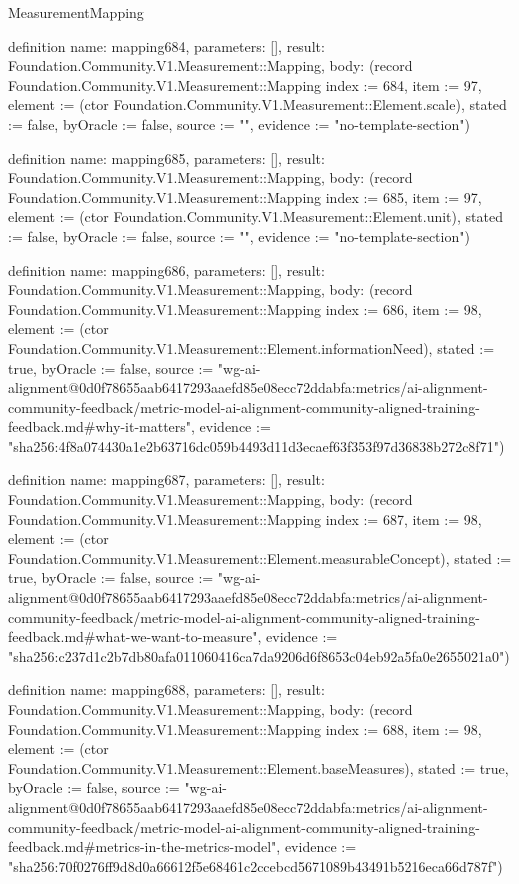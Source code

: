 \begin{lexlean}{MeasurementMapping}
\begin{semanticmodule}
definition{
  name: mapping684,
  parameters: [],
  result: Foundation.Community.V1.Measurement::Mapping,
  body: (record Foundation.Community.V1.Measurement::Mapping {index := 684, item := 97, element := (ctor Foundation.Community.V1.Measurement::Element.scale), stated := false, byOracle := false, source := "", evidence := "no-template-section"})
}

definition{
  name: mapping685,
  parameters: [],
  result: Foundation.Community.V1.Measurement::Mapping,
  body: (record Foundation.Community.V1.Measurement::Mapping {index := 685, item := 97, element := (ctor Foundation.Community.V1.Measurement::Element.unit), stated := false, byOracle := false, source := "", evidence := "no-template-section"})
}

definition{
  name: mapping686,
  parameters: [],
  result: Foundation.Community.V1.Measurement::Mapping,
  body: (record Foundation.Community.V1.Measurement::Mapping {index := 686, item := 98, element := (ctor Foundation.Community.V1.Measurement::Element.informationNeed), stated := true, byOracle := false, source := "wg-ai-alignment@0d0f78655aab6417293aaefd85e08ecc72ddabfa:metrics/ai-alignment-community-feedback/metric-model-ai-alignment-community-aligned-training-feedback.md#why-it-matters", evidence := "sha256:4f8a074430a1e2b63716dc059b4493d11d3ecaef63f353f97d36838b272c8f71"})
}

definition{
  name: mapping687,
  parameters: [],
  result: Foundation.Community.V1.Measurement::Mapping,
  body: (record Foundation.Community.V1.Measurement::Mapping {index := 687, item := 98, element := (ctor Foundation.Community.V1.Measurement::Element.measurableConcept), stated := true, byOracle := false, source := "wg-ai-alignment@0d0f78655aab6417293aaefd85e08ecc72ddabfa:metrics/ai-alignment-community-feedback/metric-model-ai-alignment-community-aligned-training-feedback.md#what-we-want-to-measure", evidence := "sha256:c237d1c2b7db80afa011060416ca7da9206d6f8653c04eb92a5fa0e2655021a0"})
}

definition{
  name: mapping688,
  parameters: [],
  result: Foundation.Community.V1.Measurement::Mapping,
  body: (record Foundation.Community.V1.Measurement::Mapping {index := 688, item := 98, element := (ctor Foundation.Community.V1.Measurement::Element.baseMeasures), stated := true, byOracle := false, source := "wg-ai-alignment@0d0f78655aab6417293aaefd85e08ecc72ddabfa:metrics/ai-alignment-community-feedback/metric-model-ai-alignment-community-aligned-training-feedback.md#metrics-in-the-metrics-model", evidence := "sha256:70f0276ff9d8d0a66612f5e68461c2ccebcd5671089b43491b5216eca66d787f"})
}


\end{semanticmodule}
\end{lexlean}
